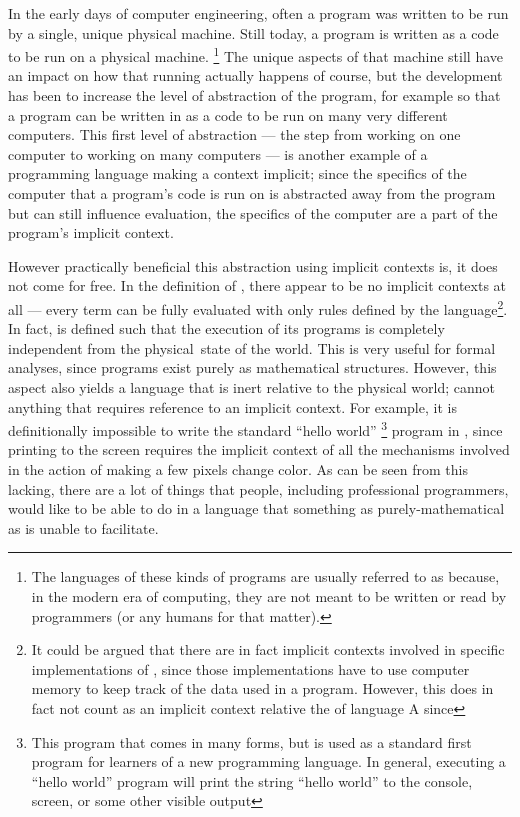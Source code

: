 In the early days of computer engineering, often a program was written to be run by a single, unique physical machine.
Still today, a program is written as a code to be run on a physical machine.%
\footnote{
  The languages of these kinds of programs are usually referred to as  because, in the modern era of computing, they are not meant to be written or read by programmers (or any humans for that matter).
}
The unique aspects of that machine still have an impact on how that running actually happens of course, but the development has been to increase the level of abstraction of the program, for example so that a program can be written in as a code to be run on many very different computers.
This first level of abstraction --- the step from working on one computer to working on many computers --- is another example of a programming language making a context implicit;
since the specifics of the computer that a program's code is run on is abstracted away from the program but can still influence evaluation,
the specifics of the computer are a part of the program's implicit context.

However practically beneficial this abstraction using implicit contexts is, it does not come for free.
In the definition of \LangA, there appear to be no implicit contexts at all --- every term can be fully evaluated with only rules defined by the language\footnote{It could be argued that there are in fact implicit contexts involved in specific implementations of \LangA, since those implementations have to use computer memory to keep track of the data used in a \LangA program. However, this does in fact not count as an implicit context relative the  of language A since }.
In fact, \LangA is defined such that the execution of its programs is completely independent from the physical state of the world.
This is very useful for formal analyses, since \LangA programs exist purely as mathematical structures.
However, this aspect also yields a language that is inert relative to the physical world;
\LangA cannot  anything that requires reference to an implicit context.
For example, it is definitionally impossible to write the standard ``hello world''%
\footnote{This program that comes in many forms, but is used as a standard first program for learners of a new programming language. In general, executing a ``hello world'' program will print the string ``hello world'' to the console, screen, or some other visible output
}
program in \LangA, since printing to the screen requires the implicit context of all the mechanisms involved in the action of making a few pixels change color.
As can be seen from this lacking, there are a lot of things that people, including professional programmers, would like to be able to do in a language that something as purely-mathematical as \LangA is unable to facilitate.

